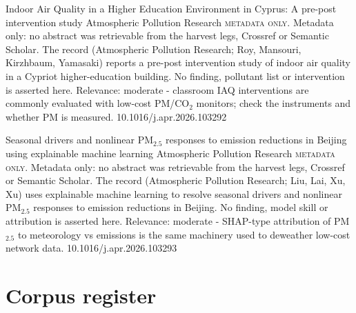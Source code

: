 \documentclass[10pt]{article}
\begin{document}
{Indoor Air Quality in a Higher Education Environment in Cyprus: A pre-post intervention study}
{Atmospheric Pollution Research}
{\textsc{metadata only.} Metadata only: no abstract was retrievable from the harvest legs, Crossref or Semantic Scholar. The record (Atmospheric Pollution Research; Roy, Mansouri, Kirzhbaum, Yamasaki) reports a pre-post intervention study of indoor air quality in a Cypriot higher-education building. No finding, pollutant list or intervention is asserted here. Relevance: moderate - classroom IAQ interventions are commonly evaluated with low-cost PM/CO$_2$ monitors; check the instruments and whether PM is measured.}
{10.1016/j.apr.2026.103292}

\par{}\baselineskip{}\baselineskip
{}

{Seasonal drivers and nonlinear PM$_{2.5}$ responses to emission reductions in Beijing using explainable machine learning}
{Atmospheric Pollution Research}
{\textsc{metadata only.} Metadata only: no abstract was retrievable from the harvest legs, Crossref or Semantic Scholar. The record (Atmospheric Pollution Research; Liu, Lai, Xu, Xu) uses explainable machine learning to resolve seasonal drivers and nonlinear PM$_{2.5}$ responses to emission reductions in Beijing. No finding, model skill or attribution is asserted here. Relevance: moderate - SHAP-type attribution of PM$_{2.5}$ to meteorology vs emissions is the same machinery used to deweather low-cost network data.}
{10.1016/j.apr.2026.103293}

\clearpage
\section*{\sffamily\bfseries\color{Deep}Corpus register}
\vspace{-1.5mm}{\color{Amber}\rule{\linewidth}{1.1pt}}\vspace{2.5mm}



\vspace{2mm}
\end{document}
